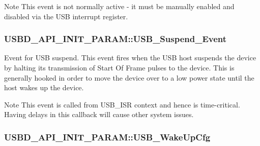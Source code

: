 \begin{DoxyNote}{Note}
This event is not normally active -\/ it must be manually enabled and disabled via the U\-S\-B interrupt register. \par
\par

\end{DoxyNote}
\hypertarget{structUSBD__API__INIT__PARAM_a3c256417cf3bdd576029d29787d6046f}{
\subsubsection[{U\-S\-B\-\_\-\-Suspend\-\_\-\-Event}]{ U\-S\-B\-D\-\_\-\-A\-P\-I\-\_\-\-I\-N\-I\-T\-\_\-\-P\-A\-R\-A\-M\-::\-U\-S\-B\-\_\-\-Suspend\-\_\-\-Event}}\label{structUSBD__API__INIT__PARAM_a3c256417cf3bdd576029d29787d6046f}
Event for U\-S\-B suspend. This event fires when the U\-S\-B host suspends the device by halting its transmission of Start Of Frame pulses to the device. This is generally hooked in order to move the device over to a low power state until the host wakes up the device. \par
\begin{DoxyNote}{Note}
This event is called from U\-S\-B\-\_\-\-I\-S\-R context and hence is time-\/critical. Having delays in this callback will cause other system issues. 
\end{DoxyNote}
\hypertarget{structUSBD__API__INIT__PARAM_a3166b630a5aa02ca07bd3df8496aba5b}{
\subsubsection[{U\-S\-B\-\_\-\-Wake\-Up\-Cfg}]{ U\-S\-B\-D\-\_\-\-A\-P\-I\-\_\-\-I\-N\-I\-T\-\_\-\-P\-A\-R\-A\-M\-::\-U\-S\-B\-\_\-\-Wake\-Up\-Cfg}}\label{structUSBD__API__INIT__PARAM_a3166b630a5aa02ca07bd3df8496aba5b}
